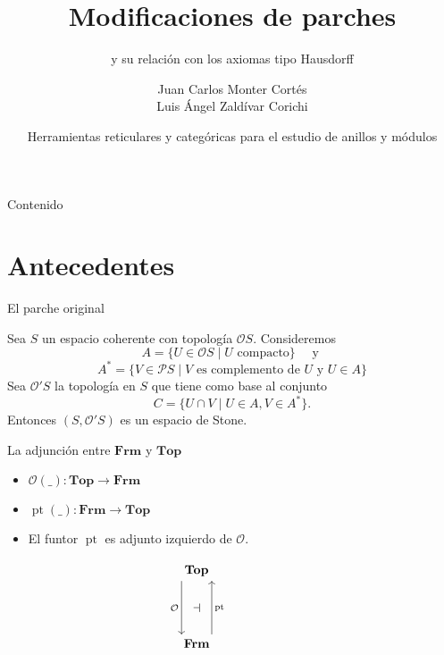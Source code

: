 \documentclass[compress,12pt]{beamer}
\title{Modificaciones de parches}
\subtitle{y su relación con los axiomas tipo Hausdorff}
\date{Herramientas reticulares y categóricas para el estudio de anillos y módulos}
\author{Juan Carlos Monter Cortés\\ Luis Ángel Zaldívar Corichi}
\institute{Universidad de Guadalajara}
\DeclareMathOperator{\pt}{pt}
\begin{document}
\frame[plain]{\titlepage}

\begin{frame}{Contenido}
\tableofcontents %
\end{frame}

\section{Antecedentes}

\begin{frame}{El parche original}
    \begin{theorem}
        Sea $S$ un espacio coherente con topología $\mathcal{O}S$. Consideremos 
        \[
        A=\{U\in \mathcal{O}S\mid U \mbox{ compacto}\}\quad\mbox{ y }
        \]
        \[
        A^*=\{V\in\mathcal{P}S\mid V \mbox{ es complemento de }U \mbox{ y }U\in A\}
        \]
        Sea $\mathcal{O}'S$ la topología en $S$ que tiene como base al conjunto
        \[
        C=\{U\cap V\mid U\in A, V\in A^*\}.
        \]
        Entonces $(S, \mathcal{O}'S)$ es un espacio de Stone.
    \end{theorem}
    
\end{frame}

\begin{frame}[fragile]{La adjunción entre $\mathbf{Frm}$ y $\mathbf{Top}$}
\begin{itemize}
    \item $\mathcal{O}(\_)\colon \mathbf{Top}\to \mathbf{Frm}$ 
    \item $\pt(\_)\colon \mathbf{Frm}\to \mathbf{Top}$
    \item El funtor $\pt$ es adjunto izquierdo de $\mathcal{O}$.
\end{itemize}
\[\begin{tikzcd}
	{\mathbf{Top}} \\
	{} & {} & {} \\
	{\mathbf{Frm}}
	\arrow["{\pt}"{name=0, swap}, from=3-1, to=1-1, shift right=5]
	\arrow["{\mathcal{O}}"{name=1, swap}, from=1-1, to=3-1, shift right=5]
	\arrow["\dashv"{rotate=0}, from=1, to=0, phantom]
\end{tikzcd}\]
    
\end{frame}
\end{document}
